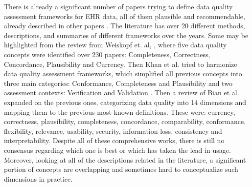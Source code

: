 There is already a significant number of papers trying to define data quality assessment frameworks for EHR data, all of them plausible and recommendable, already described in other papers \cite{bianAssessingPracticeData2020}. The literature has over 20 different methods, descriptions, and summaries of  different frameworks over the years. Some may be highlighted from the review from Weiskopf et. al, \cite{weiskopfMethodsDimensionsElectronic2013}, where five data quality concepts were identified over 230 papers: Completeness, Correctness, Concordance, Plausibility and Currency. 
Then Khan et al. tried to harmonize data quality assessment frameworks, which simplified all previous concepts into three main categories: Conformance, Completeness and Plausibility and two assessment contexts: Verification and Validation \cite{kahnHarmonizedDataQuality2016a}.
Then a review of Bian et al.  \cite{bianAssessingPracticeData2020} expanded on the previous ones, categorizing data quality into 14 dimensions and mapping them to the previous most known definitions. These were: currency, correctness, plausibility, completeness, concordance, comparability, conformance, flexibility, relevance, usability, security, information loss, consistency and interpretability. 
Despite all of these comprehensive works, there is still  no consensus regarding which one is best or which has taken the lead in usage. Moreover, looking at all of the descriptions related in the literature, a significant portion of concepts are overlapping and sometimes hard to conceptualize such dimensions in practice. 

